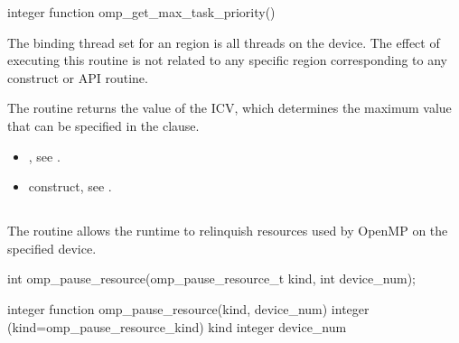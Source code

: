 \begin{fortranspecific}
\begin{ompfFunction}
integer function omp_get_max_task_priority()
\end{ompfFunction}
\end{fortranspecific}

\binding

The binding thread set for an  region is all threads
on the device. The effect of executing this routine is not related to any specific region
corresponding to any construct or API routine.

\effect

The  routine returns the value of the 
ICV, which determines the maximum value that can be specified in the  clause.

\crossreferences

\begin{itemize}
\item {}, see
.

\item {} construct, see
.
\end{itemize}




\subsection{}
\label{subsec:omp_pause_resource}
\summary

The  routine allows the runtime to 
relinquish resources used by OpenMP on the specified device.

\begin{samepage}
\format
\begin{ccppspecific}
\begin{ompcFunction}
int omp_pause_resource(omp_pause_resource_t kind, int device_num);
\end{ompcFunction}
\end{ccppspecific}
\end{samepage}

\begin{fortranspecific}
\begin{ompfFunction}
integer function omp_pause_resource(kind, device_num)
integer (kind=omp_pause_resource_kind) kind
integer device_num
\end{ompfFunction}
\end{fortranspecific}

